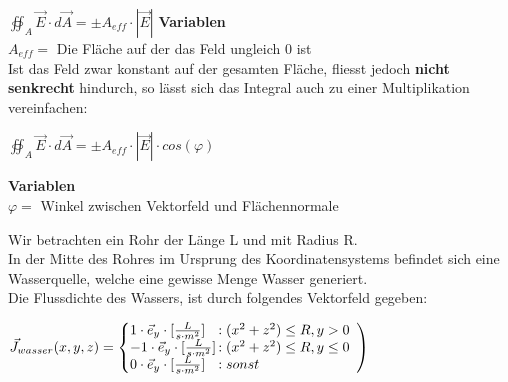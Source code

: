\formulaBegin
$ \displaystyle \oiint_A \vec{E} \cdot d\vec{A} = \pm A_{eff} \cdot |\vec{E}|$
\formulaEnd
\textbf{Variablen} \\
$A_{eff} =$ Die Fläche auf der das Feld ungleich 0 ist\\


Ist das Feld zwar konstant auf der gesamten Fläche, fliesst jedoch \textbf{nicht senkrecht} hindurch, so lässt sich das Integral auch zu einer Multiplikation vereinfachen:
\begin{center}
\end{center}
\formulaBegin
$ \displaystyle \oiint_A \vec{E} \cdot d\vec{A} = \pm A_{eff} \cdot |\vec{E}| \cdot cos(\varphi)$
\formulaEnd

\textbf{Variablen} \\
$\varphi =$ Winkel zwischen Vektorfeld und Flächennormale\\
\iend


\newpage


\beginbsp
Wir betrachten ein Rohr der Länge L und mit Radius R. \\
In der Mitte des Rohres im Ursprung des Koordinatensystems befindet sich eine Wasserquelle, welche eine gewisse Menge Wasser generiert. \\
Die Flussdichte des Wassers, ist durch folgendes Vektorfeld gegeben: \\
\begin{center}

	$\displaystyle  \vec{J}_{wasser}(x,y,z) = \left\{
	\begin{array}{@{}l@{\thinspace}l}
		1 \cdot \vec{e}_y  \cdot [\frac{L}{s \cdot m^2}] & :  (x^2 + z^2) \leq R, y > 0 \\
			-1 \cdot \vec{e}_y  \cdot [\frac{L}{s \cdot m^2}] & :  (x^2 + z^2) \leq R, y \leq 0 \\
		0 \cdot \vec{e}_y  \cdot [\frac{L}{s \cdot m^2}] & : sonst                                                   \\
	\end{array}
	\right ) $
\end{center}

